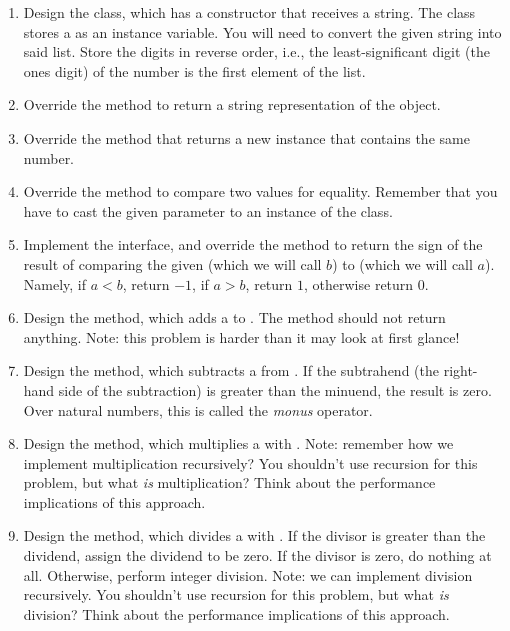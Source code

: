 \begin{enumerate}[label=(\alph*)]
    \item Design the  class, which has a constructor that receives a string. The  class stores a  as an instance variable. You will need to convert the given string into said list. Store the digits in reverse order, i.e., the least-significant digit (the ones digit) of the number is the first element of the list.
    \item Override the  method to return a string representation of the  object. 
    \item Override the  method that returns a new  instance that contains the same number.
    \item Override the  method to compare two  values for equality. Remember that you have to cast the given parameter to an instance of the  class. 
    \item Implement the  interface, and override the  method to return the sign of the result of comparing the given  (which we will call $b$) to   (which we will call $a$). Namely, if $a < b$, return $-1$, if $a > b$, return $1$, otherwise return $0$.
    \item Design the  method, which adds a  to  . The method should not return anything. Note: this problem is harder than it may look at first glance!
    \item Design the  method, which subtracts a  from  . If the subtrahend (the right-hand side of the subtraction) is greater than the minuend, the result is zero. Over natural numbers, this is called the \emph{monus} operator.
    \item Design the  method, which multiplies a  with  . Note: remember how we implement multiplication recursively? You shouldn't use recursion for this problem, but what \emph{is} multiplication? Think about the performance implications of this approach.
    \item Design the  method, which divides a  with  . If the divisor is greater than the dividend, assign the dividend to be zero. If the divisor is zero, do nothing at all. Otherwise, perform integer division. Note: we can implement division recursively. You shouldn't use recursion for this problem, but what \emph{is} division? Think about the performance implications of this approach.
\end{enumerate}

